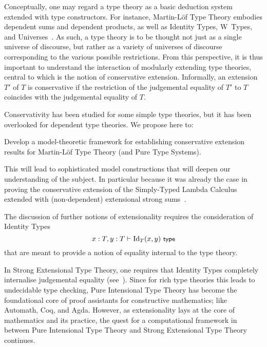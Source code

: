 \documentclass[11pt,twocolumn]{article}
\newcounter{CC}
\newenvironment{resenumerate}
  {\begin{list}{[\textbf{\arabic{CC}]}}
  {\usecounter{CC}
   \setlength{\topsep}{2pt}
   \setlength{\partopsep}{2pt}
   \setlength{\itemsep}{2.5pt}
   \setlength{\parsep}{2.5pt}
   \setlength{\leftmargin}{1.65em}
   \setlength{\labelwidth}{1.15em}
 }}
  {\end{list}}
\newcommand{\hide}[1]{}
\newcommand{\eg}{\emph{eg.}}
\newcommand{\vs}{\emph{vs.}}
\newcommand{\Id}{\mathrm{Id}}
\begin{document}
\hide{CwFs \vs~substitution algebras}

Conceptually, one may regard a type theory as a basic deduction system
extended with type constructors.  For instance, Martin-L\"of Type Theory
embodies dependent sums and dependent products, as well as Identity Types,
W~Types, and Universes~\cite{ProgMLTT}.  As such, a type theory is to be
thought not just as a single universe of discourse, but rather as a
variety of universes of discourse corresponding to the various possible
restrictions.  From this perspective, it is thus important to understand the
interaction of modularly extending type theories, central to which is the
notion of conservative extension.  Informally, an extension $T'$ of $T$ is
conservative if the restriction of the judgemental equality of $T'$ to $T$
coincides with the judgemental equality of $T$.

Conservativity has been studied for some simple type 
theories, %
but it has been overlooked for dependent type theories.  We propose here to:
\begin{resenumerate}\setcounter{CC}{3}
\item
  Develop a model-theoretic framework for establishing conservative
  extension results for Martin-L\"of Type Theory (and Pure Type Systems).
\end{resenumerate}
This will lead to sophisticated model constructions that will deepen our
understanding of the subject.  In particular because it was already the case
in proving the conservative extension of the Simply-Typed Lambda Calculus
extended with (non-dependent) extensional strong sums~\cite{FioreRemarks}.

The discussion of further notions of extensionality requires the consideration
of Identity Types
\[
  x:T,y:T\vdash\Id_T(x,y)\ \mbox{\small$\mathsf{type}$}
\]
that are meant to provide a notion of equality internal to the type theory.

In Strong Extensional Type Theory, one requires that Identity Types completely
internalise judgemental equality (see~\cite{MartinLofETT}).  Since for rich
type theories this leads to undecidable type checking, Pure Intensional Type
Theory has become the foundational core of proof assistants for constructive
mathematics; like
Automath, %
Coq, %
and 
Agda. %
However, as extensionality lays at the core of mathematics and its practice,
the quest for a computational framework in between Pure Intensional Type
Theory and Strong Extensional Type Theory continues.
\end{document}
